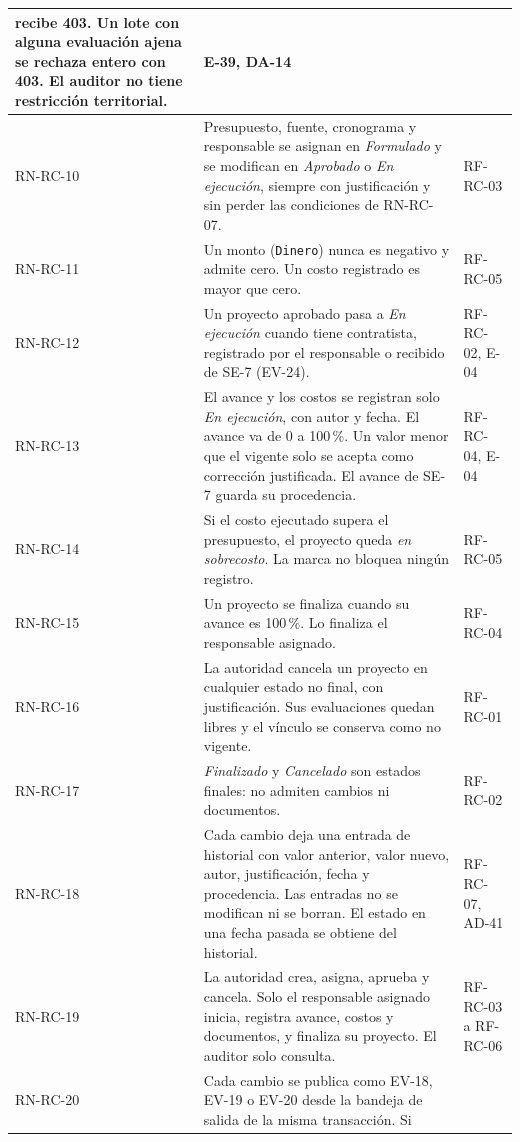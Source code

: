 \documentclass[11pt,a4paper]{article}
\begin{document}
{\begin{longtable}{|P{1.7cm}|P{10.6cm}|P{2.3cm}|}
    recibe 403. Un lote con alguna evaluación ajena se rechaza entero con 403. El auditor no tiene restricción
    territorial. & E-39, DA-14 \\ \hline
  RN-RC-10 & Presupuesto, fuente, cronograma y responsable se asignan en \emph{Formulado} y se modifican en
    \emph{Aprobado} o \emph{En ejecución}, siempre con justificación y sin perder las condiciones de RN-RC-07. &
    RF-RC-03 \\ \hline
  RN-RC-11 & Un monto (\texttt{Dinero}) nunca es negativo y admite cero. Un costo registrado es mayor que cero. &
    RF-RC-05 \\ \hline
  RN-RC-12 & Un proyecto aprobado pasa a \emph{En ejecución} cuando tiene contratista, registrado por el responsable o
    recibido de SE-7 (EV-24). & RF-RC-02, E-04 \\ \hline
  RN-RC-13 & El avance y los costos se registran solo \emph{En ejecución}, con autor y fecha. El avance va de 0 a
    100\,\%. Un valor menor que el vigente solo se acepta como corrección justificada. El avance de SE-7 guarda su
    procedencia. & RF-RC-04, E-04 \\ \hline
  RN-RC-14 & Si el costo ejecutado supera el presupuesto, el proyecto queda \emph{en sobrecosto}. La marca no bloquea
    ningún registro. & RF-RC-05 \\ \hline
  RN-RC-15 & Un proyecto se finaliza cuando su avance es 100\,\%. Lo finaliza el responsable asignado. & RF-RC-04 \\
    \hline
  RN-RC-16 & La autoridad cancela un proyecto en cualquier estado no final, con justificación. Sus evaluaciones
    quedan libres y el vínculo se conserva como no vigente. & RF-RC-01 \\ \hline
  RN-RC-17 & \emph{Finalizado} y \emph{Cancelado} son estados finales: no admiten cambios ni documentos. & RF-RC-02 \\
    \hline
  RN-RC-18 & Cada cambio deja una entrada de historial con valor anterior, valor nuevo, autor, justificación, fecha y
    procedencia. Las entradas no se modifican ni se borran. El estado en una fecha pasada se obtiene del
    historial. & RF-RC-07, AD-41 \\ \hline
  RN-RC-19 & La autoridad crea, asigna, aprueba y cancela. Solo el responsable asignado inicia, registra avance,
    costos y documentos, y finaliza su proyecto. El auditor solo consulta. & RF-RC-03 a RF-RC-06 \\ \hline
  RN-RC-20 & Cada cambio se publica como EV-18, EV-19 o EV-20 desde la bandeja de salida de la misma transacción. Si

\end{longtable}}
\end{document}
